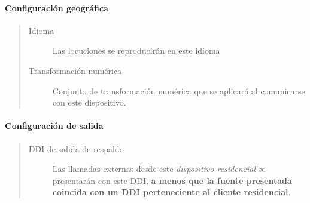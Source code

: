 \documentclass[letterpaper,10pt,spanish]{sphinxmanual}
\begin{document}
\paragraph{Configuración geográfica}
\label{administration_portal/client/residential/residential_devices:geographic-configuration}\begin{quote}
\begin{description}
\item[{Idioma}] \leavevmode
Las locuciones se reproducirán en este idioma

\item[{Transformación numérica}] \leavevmode
Conjunto de transformación numérica que se aplicará al comunicarse con este dispositivo.

\end{description}
\end{quote}


\paragraph{Configuración de salida}
\label{administration_portal/client/residential/residential_devices:outgoing-configuration}\begin{quote}
\begin{description}
\item[{DDI de salida de respaldo}] \leavevmode
Las llamadas externas desde este \emph{dispositivo residencial} se presentarán con este DDI, \textbf{a menos que la fuente presentada coincida con un DDI perteneciente al cliente residencial}.

\end{description}
\end{quote}
\end{document}
